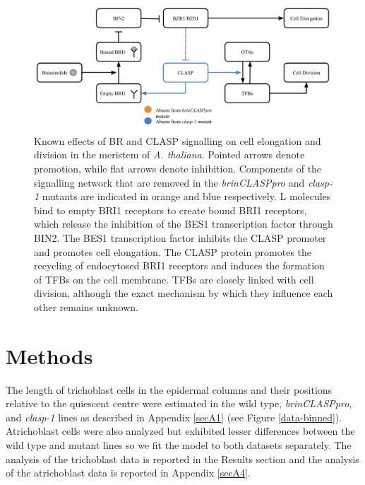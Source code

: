 \documentclass[referee,pdflatex,sn-mathphys-num]{sn-jnl}
\begin{document}
\begin{figure}
\centering
\includegraphics[width=\textwidth]{network-complete.png}
\caption{Known effects of BR and CLASP signalling on cell elongation and division in the meristem of \emph{A. thaliana}. Pointed arrows denote promotion, while flat arrows denote inhibition.
Components of the signalling network that are removed in the \emph{brinCLASPpro} and \emph{clasp-1} mutants are indicated in orange and blue respectively.
 L molecules bind to empty BRI1 receptors to create bound BRI1 receptors, which release the inhibition of the BES1 transcription factor through BIN2.
The BES1 transcription factor inhibits the CLASP promoter and promotes cell elongation.
The CLASP protein promotes the recycling of endocytosed BRI1 receptors and induces the formation of TFBs on the cell membrane.
TFBs are closely linked with cell division, although the exact mechanism by which they influence each other remains unknown. }
\label{network}
\end{figure}

\section*{Methods}\label{sec11}

The length of trichoblast cells in the epidermal columns and their positions relative to the quiescent centre were estimated in the wild type, \emph{brinCLASPpro}, and \emph{clasp-1} lines as described in Appendix \ref{secA1} (see Figure \ref{data-binned}).
Atrichoblast cells were also analyzed but exhibited lesser differences between the wild type and mutant lines so we fit the model to both datasets separately. 
The analysis of the trichoblast data is reported in the Results section and the analysis of the atrichoblast data is reported in Appendix \ref{secA4}.
\end{document}
